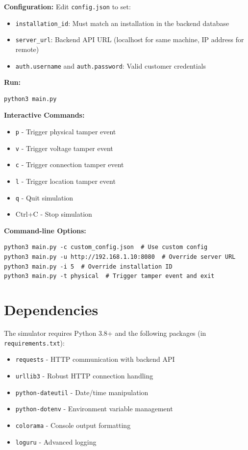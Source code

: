 \documentclass[
]{elteikthesis}[2024/04/26]
\begin{document}
\textbf{Configuration:} Edit \texttt{config.json} to set:
\begin{itemize}
    \item \texttt{installation\_id}: Must match an installation in the backend database
    \item \texttt{server\_url}: Backend API URL (localhost for same machine, IP address for remote)
    \item \texttt{auth.username} and \texttt{auth.password}: Valid customer credentials
\end{itemize}

\textbf{Run:}
\begin{verbatim}
python3 main.py
\end{verbatim}

\textbf{Interactive Commands:}
\begin{itemize}
    \item \texttt{p} - Trigger physical tamper event
    \item \texttt{v} - Trigger voltage tamper event
    \item \texttt{c} - Trigger connection tamper event
    \item \texttt{l} - Trigger location tamper event
    \item \texttt{q} - Quit simulation
    \item Ctrl+C - Stop simulation
\end{itemize}

\textbf{Command-line Options:}
\begin{verbatim}
python3 main.py -c custom_config.json  # Use custom config
python3 main.py -u http://192.168.1.10:8080  # Override server URL
python3 main.py -i 5  # Override installation ID
python3 main.py -t physical  # Trigger tamper event and exit
\end{verbatim}

\section{Dependencies}
The simulator requires Python 3.8+ and the following packages (in \texttt{requirements.txt}):
\begin{itemize}
    \item \texttt{requests} - HTTP communication with backend API
    \item \texttt{urllib3} - Robust HTTP connection handling
    \item \texttt{python-dateutil} - Date/time manipulation
    \item \texttt{python-dotenv} - Environment variable management
    \item \texttt{colorama} - Console output formatting
    \item \texttt{loguru} - Advanced logging
\end{itemize}
\end{document}

